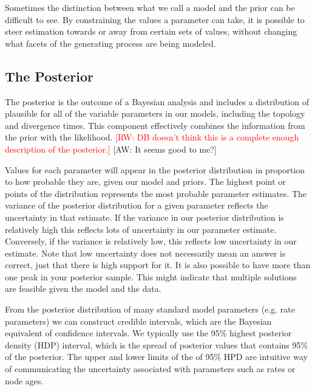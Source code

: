 \documentclass[11pt]{article}
\newcommand{\rw}[1]{{\textcolor{red}{[RW: #1]}}} %
\newcommand{\aw}[1]{{\textcolor{armygreen}{[AW: #1]}}} %
\begin{document}
Sometimes the distinction between what we call a model and the prior can be difficult to see.
By constraining the values a parameter can take, it is possible to steer estimation towards or away from certain sets of values, without changing what facets of the generating process are being modeled. 

\subsection{The Posterior}

The posterior is the outcome of a Bayesian analysis and includes a distribution of plausible for all of the variable parameters in our models, including the topology and divergence times.
This component effectively combines the information from the prior with the likelihood. \rw{DB doesn't think this is a complete enough description of the posterior.} \aw{It seems good to me?}

Values for each parameter will appear in the posterior distribution in proportion to how probable they are, given our model and priors.
The highest point or points of the distribution represents the most probable parameter estimates.
The variance of the posterior distribution for a given parameter reflects the uncertainty in that estimate.
If the variance in our posterior distribution is relatively high this reflects lots of uncertainty in our parameter estimate.
Conversely, if the variance is relatively low, this reflects low uncertainty in our estimate.
Note that low uncertainty does not necessarily mean an answer is correct, just that there is high support for it.
It is also possible to have more than one peak in your posterior sample.
This might indicate that multiple solutions are feasible given the model and the data.

From the posterior distribution of many standard model parameters (e.g. rate parameters) we can construct credible intervals, which are the Bayesian equivalent of confidence intervals.  
We typically use the 95\% highest posterior density (HDP) interval, which is the spread of posterior values that contains 95\% of the posterior.
The upper and lower limits of the of 95\% HPD are intuitive way of communicating the uncertainty associated with parameters such as rates or node ages.
\end{document}
